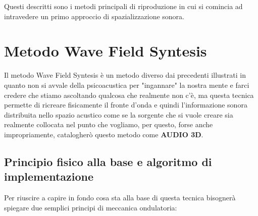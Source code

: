\documentclass[12pt,a4paper]{report}
\begin{document}
Questi descritti sono i metodi principali di riproduzione in cui si comincia ad intravedere un primo approccio di spazializzazione	 sonora.





\chapter{Metodo Wave Field Syntesis}

Il metodo Wave Field Syntesis è un metodo diverso dai precedenti illustrati in quanto non si avvale della psicoacustica per "ingannare" la nostra mente e farci credere che stiamo ascoltando qualcosa che realmente non c'è, ma questa tecnica permette di ricreare fisicamente il fronte d'onda e quindi l'informazione sonora distribuita nello spazio acustico come se la sorgente che si vuole creare sia realmente collocata nel punto che vogliamo, per questo, forse anche impropriamente, catalogherò questo metodo come \textbf{AUDIO 3D}.\\

\section{Principio fisico alla base e algoritmo di implementazione}

Per riuscire a capire in fondo cosa sta alla base di questa tecnica bisognerà spiegare due semplici principi di meccanica ondulatoria: 
\end{document}
